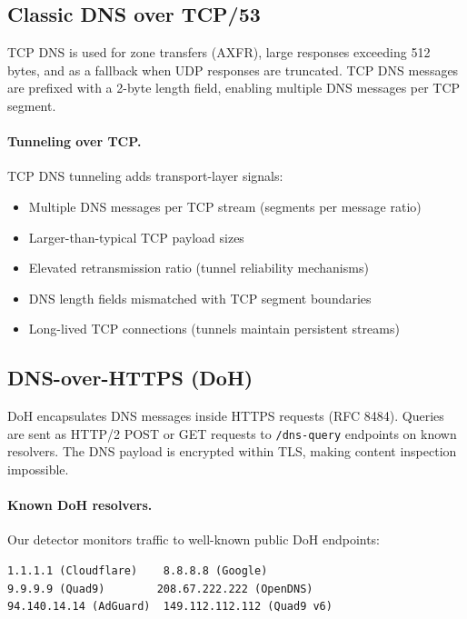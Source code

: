 \documentclass[12pt,a4paper]{article}
\begin{document}
\subsection{Classic DNS over TCP/53}

TCP DNS is used for zone transfers (AXFR), large responses exceeding 512 bytes, and as a fallback when UDP responses are truncated. TCP DNS messages are prefixed with a 2-byte length field, enabling multiple DNS messages per TCP segment.

\paragraph{Tunneling over TCP.}
TCP DNS tunneling adds transport-layer signals:
\begin{itemize}
    \item Multiple DNS messages per TCP stream (segments per message ratio)
    \item Larger-than-typical TCP payload sizes
    \item Elevated retransmission ratio (tunnel reliability mechanisms)
    \item DNS length fields mismatched with TCP segment boundaries
    \item Long-lived TCP connections (tunnels maintain persistent streams)
\end{itemize}

\subsection{DNS-over-HTTPS (DoH)}

DoH encapsulates DNS messages inside HTTPS requests (RFC 8484). Queries are sent as HTTP/2 POST or GET requests to \texttt{/dns-query} endpoints on known resolvers. The DNS payload is encrypted within TLS, making content inspection impossible.

\paragraph{Known DoH resolvers.}
Our detector monitors traffic to well-known public DoH endpoints:
\begin{lstlisting}
1.1.1.1 (Cloudflare)    8.8.8.8 (Google)
9.9.9.9 (Quad9)        208.67.222.222 (OpenDNS)
94.140.14.14 (AdGuard)  149.112.112.112 (Quad9 v6)
\end{lstlisting}
\end{document}
